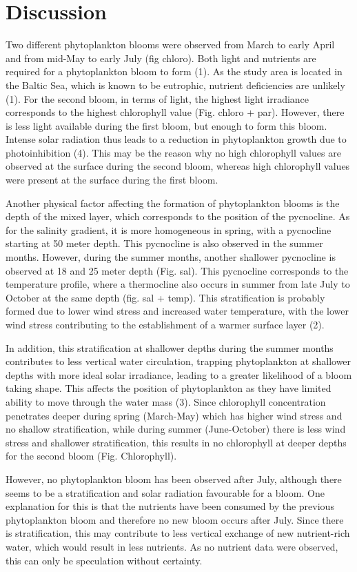 \documentclass[../Main.tex]{subfiles}
\begin{document}
\section{Discussion}
Two different phytoplankton blooms were observed from March to early April and from mid-May to early July (fig chloro). Both light and nutrients are required for a phytoplankton bloom to form (1). As the study area is located in the Baltic Sea, which is known to be eutrophic, nutrient deficiencies are unlikely (1). For the second bloom, in terms of light, the highest light irradiance corresponds to the highest chlorophyll value (Fig. chloro + par). However, there is less light available during the first bloom, but enough to form this bloom. Intense solar radiation thus leads to a reduction in phytoplankton growth due to photoinhibition (4). This may be the reason why no high chlorophyll values are observed at the surface during the second bloom, whereas high chlorophyll values were present at the surface during the first bloom.  

Another physical factor affecting the formation of phytoplankton blooms is the depth of the mixed layer, which corresponds to the position of the pycnocline. As for the salinity gradient, it is more homogeneous in spring, with a pycnocline starting at 50 meter depth. This pycnocline is also observed in the summer months. However, during the summer months, another shallower pycnocline is observed at 18 and 25 meter depth (Fig. sal). This pycnocline corresponds to the temperature profile, where a thermocline also occurs in summer from late July to October at the same depth (fig. sal + temp). This stratification is probably formed due to lower wind stress and increased water temperature, with the lower wind stress contributing to the establishment of a warmer surface layer (2).

In addition, this stratification at shallower depths during the summer months contributes to less vertical water circulation, trapping phytoplankton at shallower depths with more ideal solar irradiance, leading to a greater likelihood of a bloom taking shape. This affects the position of phytoplankton as they have limited ability to move through the water mass (3). Since chlorophyll concentration penetrates deeper during spring (March-May) which has higher wind stress and no shallow stratification, while during summer (June-October) there is less wind stress and shallower stratification, this results in no chlorophyll at deeper depths for the second bloom (Fig. Chlorophyll).

However, no phytoplankton bloom has been observed after July, although there seems to be a stratification and solar radiation favourable for a bloom. One explanation for this is that the nutrients have been consumed by the previous phytoplankton bloom and therefore no new bloom occurs after July. Since there is stratification, this may contribute to less vertical exchange of new nutrient-rich water, which would result in less nutrients. As no nutrient data were observed, this can only be speculation without certainty. 
\end{document}
